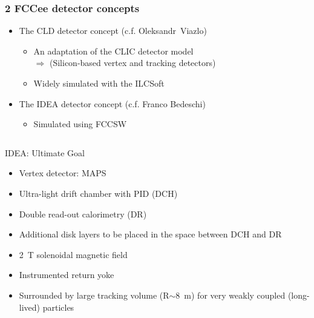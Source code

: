 \documentclass[aspectratio=169, hyperref={colorlinks=true,pdfpagelabels=false,linkcolor=black}, xcolor=dvipsnames,10pt]{beamer}
\begin{document}
\begin{frame}
	\frametitle{2 FCCee detector concepts}
	
		\begin{itemize}
		\item The CLD detector concept (c.f. Oleksandr~Viazlo)
			\begin{itemize}
			\item An adaptation of the CLIC detector model 
			\\ $\Rightarrow$ (Silicon-based vertex and tracking detectors)
			\item Widely simulated with the ILCSoft
			\end{itemize}
		\item The IDEA detector concept (c.f. Franco Bedeschi)
			\begin{itemize}
			\item Simulated using FCCSW
			\end{itemize}
		\end{itemize}

	
	\begin{columns}
	
	\begin{block}{IDEA: Ultimate Goal}
	\begin{itemize}
	\item Vertex detector: MAPS
	\item Ultra-light drift chamber with PID (DCH)
	\item Double read-out calorimetry (DR)
        \item Additional disk layers to be placed in the space between DCH and DR 
	\item 2~T solenoidal magnetic field
	\item Instrumented return yoke
	\item Surrounded by large tracking volume (R$\sim$8~m) for very weakly coupled (long-lived) particles
	\end{itemize}
	\end{block}


\end{columns}
\end{frame}
\end{document}
